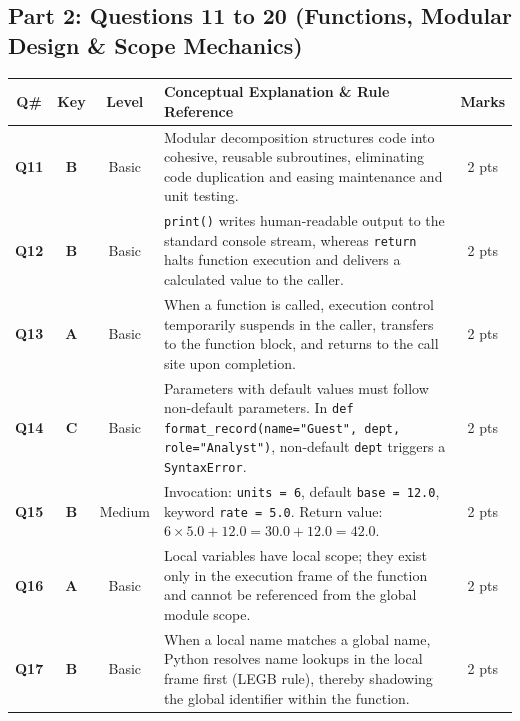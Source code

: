 \documentclass[11pt,a4paper]{article}
\begin{document}
\newpage

\subsection*{Part 2: Questions 11 to 20 (Functions, Modular Design \& Scope Mechanics)}

\begin{center}
\renewcommand{\arraystretch}{1.10}
\setlength{\tabcolsep}{3.5pt}
\begin{tabularx}{\textwidth}{|c|c|c|X|c|}
\hline
\textbf{Q\#} & \textbf{Key} & \textbf{Level} & \textbf{Conceptual Explanation \& Rule Reference} & \textbf{Marks} \\
\hline
\textbf{Q11} & \textbf{B} & Basic & Modular decomposition structures code into cohesive, reusable subroutines, eliminating code duplication and easing maintenance and unit testing. & 2 pts \\
\hline
\textbf{Q12} & \textbf{B} & Basic & \texttt{print()} writes human-readable output to the standard console stream, whereas \texttt{return} halts function execution and delivers a calculated value to the caller. & 2 pts \\
\hline
\textbf{Q13} & \textbf{A} & Basic & When a function is called, execution control temporarily suspends in the caller, transfers to the function block, and returns to the call site upon completion. & 2 pts \\
\hline
\textbf{Q14} & \textbf{C} & Basic & Parameters with default values must follow non-default parameters. In \texttt{def format\_record(name="Guest", dept, role="Analyst")}, non-default \texttt{dept} triggers a \texttt{SyntaxError}. & 2 pts \\
\hline
\textbf{Q15} & \textbf{B} & Medium & Invocation: \texttt{units = 6}, default \texttt{base = 12.0}, keyword \texttt{rate = 5.0}. Return value: $6 \times 5.0 + 12.0 = 30.0 + 12.0 = 42.0$. & 2 pts \\
\hline
\textbf{Q16} & \textbf{A} & Basic & Local variables have local scope; they exist only in the execution frame of the function and cannot be referenced from the global module scope. & 2 pts \\
\hline
\textbf{Q17} & \textbf{B} & Basic & When a local name matches a global name, Python resolves name lookups in the local frame first (LEGB rule), thereby shadowing the global identifier within the function. & 2 pts \\

\end{tabularx}
\end{center}
\end{document}

